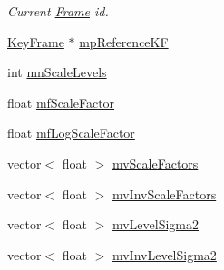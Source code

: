 \begin{DoxyCompactItemize}
\begin{DoxyCompactList}\small\item\em Current \mbox{\hyperlink{class_o_r_b___s_l_a_m2_1_1_frame}{Frame}} id. \end{DoxyCompactList}\item 
\mbox{\hyperlink{class_o_r_b___s_l_a_m2_1_1_key_frame}{Key\+Frame}} $\ast$ \mbox{\hyperlink{class_o_r_b___s_l_a_m2_1_1_frame_a4f5187c3a75ef493687fa0582fed0aa8}{mp\+Reference\+KF}}
\item 
int \mbox{\hyperlink{class_o_r_b___s_l_a_m2_1_1_frame_a4c4b02f27be28aec6cb8bb1bab3f622f}{mn\+Scale\+Levels}}
\item 
float \mbox{\hyperlink{class_o_r_b___s_l_a_m2_1_1_frame_aab180286bac29f4e030ce850c51c435c}{mf\+Scale\+Factor}}
\item 
float \mbox{\hyperlink{class_o_r_b___s_l_a_m2_1_1_frame_ad3ddefb0665fb5128391a7e59a236e9a}{mf\+Log\+Scale\+Factor}}
\item 
vector$<$ float $>$ \mbox{\hyperlink{class_o_r_b___s_l_a_m2_1_1_frame_a55d7bd3fa5d3fa8d2ecf18609e91f98e}{mv\+Scale\+Factors}}
\item 
vector$<$ float $>$ \mbox{\hyperlink{class_o_r_b___s_l_a_m2_1_1_frame_a4c7ed1316a886b9a7c3f02ee13219b8c}{mv\+Inv\+Scale\+Factors}}
\item 
vector$<$ float $>$ \mbox{\hyperlink{class_o_r_b___s_l_a_m2_1_1_frame_afba8ed34e98d14761be2c1922863cd65}{mv\+Level\+Sigma2}}
\item 
vector$<$ float $>$ \mbox{\hyperlink{class_o_r_b___s_l_a_m2_1_1_frame_a1979f999e1d3a858bf7db733791a477e}{mv\+Inv\+Level\+Sigma2}}
\end{DoxyCompactItemize}
